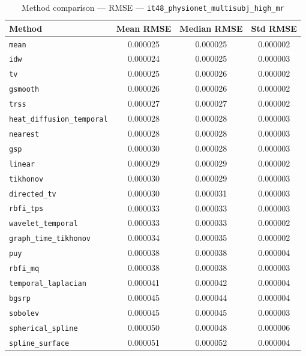 \begin{table}[ht]
\centering
\caption{Method comparison — RMSE — \texttt{it48_physionet_multisubj_high_mr}}
\label{tab:rmse_it48_physionet_multisubj_high_mr}
\begin{tabular}{lccc}
\hline
Method & Mean RMSE & Median RMSE & Std RMSE \\
\hline
\texttt{mean} & 0.000025 & 0.000025 & 0.000002 \\
\texttt{idw} & 0.000024 & 0.000025 & 0.000003 \\
\texttt{tv} & 0.000025 & 0.000026 & 0.000002 \\
\texttt{gsmooth} & 0.000026 & 0.000026 & 0.000002 \\
\texttt{trss} & 0.000027 & 0.000027 & 0.000002 \\
\texttt{heat_diffusion_temporal} & 0.000028 & 0.000028 & 0.000003 \\
\texttt{nearest} & 0.000028 & 0.000028 & 0.000003 \\
\texttt{gsp} & 0.000030 & 0.000028 & 0.000003 \\
\texttt{linear} & 0.000029 & 0.000029 & 0.000002 \\
\texttt{tikhonov} & 0.000030 & 0.000029 & 0.000003 \\
\texttt{directed_tv} & 0.000030 & 0.000031 & 0.000003 \\
\texttt{rbfi_tps} & 0.000033 & 0.000033 & 0.000003 \\
\texttt{wavelet_temporal} & 0.000033 & 0.000033 & 0.000002 \\
\texttt{graph_time_tikhonov} & 0.000034 & 0.000035 & 0.000002 \\
\texttt{puy} & 0.000038 & 0.000038 & 0.000004 \\
\texttt{rbfi_mq} & 0.000038 & 0.000038 & 0.000003 \\
\texttt{temporal_laplacian} & 0.000041 & 0.000042 & 0.000004 \\
\texttt{bgsrp} & 0.000045 & 0.000044 & 0.000004 \\
\texttt{sobolev} & 0.000045 & 0.000045 & 0.000003 \\
\texttt{spherical_spline} & 0.000050 & 0.000048 & 0.000006 \\
\texttt{spline_surface} & 0.000051 & 0.000052 & 0.000004 \\
\hline
\end{tabular}
\end{table}
